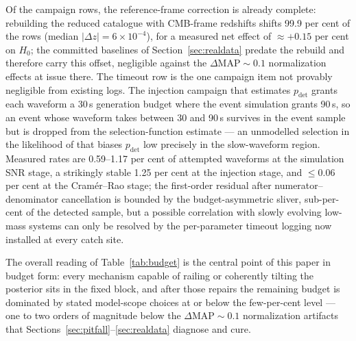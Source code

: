 Of the campaign rows, the reference-frame correction is already complete: rebuilding the reduced catalogue with CMB-frame redshifts shifts 99.9 per cent of the rows (median $|\Delta z| = 6\times10^{-4}$), for a measured net effect of $\approx +0.15$ per cent on $H_0$; the committed baselines of Section~\ref{sec:realdata} predate the rebuild and therefore carry this offset, negligible against the $\Delta\mathrm{MAP} \sim 0.1$ normalization effects at issue there. %
The timeout row is the one campaign item not provably negligible from existing logs. The injection campaign that estimates $p_\mathrm{det}$ grants each waveform a 30\,s generation budget where the event simulation grants 90\,s, so an event whose waveform takes between 30 and 90\,s survives in the event sample but is dropped from the selection-function estimate --- an unmodelled selection in the likelihood of \citet{Gray:2019ksv} that biases $p_\mathrm{det}$ low precisely in the slow-waveform region. %
Measured rates are 0.59--1.17 per cent of attempted waveforms at the simulation SNR stage, a strikingly stable 1.25 per cent at the injection stage, and $\leq 0.06$ per cent at the Cram\'er--Rao stage; the first-order residual after numerator--denominator cancellation is bounded by the budget-asymmetric sliver, sub-per-cent of the detected sample, but a possible correlation with slowly evolving low-mass systems can only be resolved by the per-parameter timeout logging now installed at every catch site. %

The overall reading of Table~\ref{tab:budget} is the central point of this paper in budget form: every mechanism capable of railing or coherently tilting the posterior sits in the fixed block, and after those repairs the remaining budget is dominated by stated model-scope choices at or below the few-per-cent level --- one to two orders of magnitude below the $\Delta\mathrm{MAP} \sim 0.1$ normalization artifacts that Sections~\ref{sec:pitfall}--\ref{sec:realdata} diagnose and cure. %
